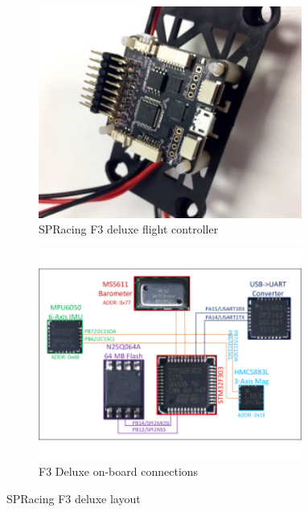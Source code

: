 \par
\begin{figure}[htbp]
\begin{subfigure}{0.5\textwidth}
\centering
\includegraphics[width=0.95\textwidth]{figs/f3-deluxe}
\caption{SPRacing F3 deluxe flight controller}
\end{subfigure}
\begin{subfigure}{0.5\textwidth}
\centering
\includegraphics[width=0.95\textwidth]{figs/f3-deluxe-board}
\caption{F3 Deluxe on-board connections}
\label{fig:f3-deluxe-board}
\end{subfigure}
\caption{SPRacing F3 deluxe layout}
\label{fig:f3-deluxe-layout}
\vspace{-10pt}
\end{figure}
